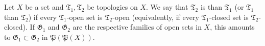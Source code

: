Let $X$ be a set and $\mathfrak{T}_1, \mathfrak{T}_2$ be topologies on $X$. We say that $\mathfrak{T}_2$ is  than $\mathfrak{T}_1$ (or $\mathfrak{T}_1$  than $\mathfrak{T}_2$) if every $\mathfrak{T}_1$-open set is $\mathfrak{T}_2$-open (equivalently, if every $\mathfrak{T}_1$-closed set is $\mathfrak{T}_2$-closed). If $\mathfrak{G}_1$ and $\mathfrak{G}_2$ are the respective families of open sets in $X$, this amounts to $\mathfrak{G}_1 \subset \mathfrak{G}_2$ in $\mathfrak{P}(\mathfrak{P}(X))$.
